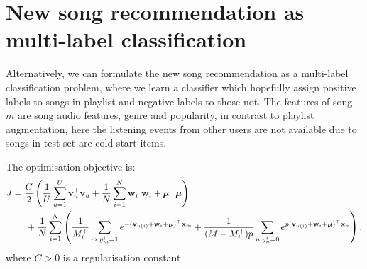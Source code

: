 \section{New song recommendation as multi-label classification}

Alternatively, we can formulate the new song recommendation as a multi-label classification problem,
where we learn a classifier which hopefully assign positive labels to songs in playlist and negative labels to those not.
The features of song $m$ are song audio features, genre and popularity, in contrast to playlist augmentation,
here the listening events from other users are not available due to songs in test set are cold-start items.

The optimisation objective is:
\begin{equation*}
\begin{aligned}
J &= \frac{C}{2} \left( \frac{1}{U} \sum_{u=1}^U \mathbf{v}_u^\top \mathbf{v}_u 
     + \frac{1}{N} \sum_{i=1}^N \mathbf{w}_i^\top \mathbf{w}_i + \bm{\mu}^\top \bm{\mu} \right) \\
& \hspace{1.5em}
     + \frac{1}{N} \sum_{i=1}^N \left( \frac{1}{M_i^+} \sum_{m: y_m^i = 1} e^{-(\mathbf{v}_{u(i)} + \mathbf{w}_i + \bm{\mu})^\top \mathbf{x}_m} 
     + \frac{1}{(M - M_i^+) p} \sum_{n: y_n^i = 0} e^{p (\mathbf{v}_{u(i)} + \mathbf{w}_i + \bm{\mu})^\top \mathbf{x}_n} \right),
\end{aligned}
\end{equation*}
where $C > 0$ is a regularisation constant.
